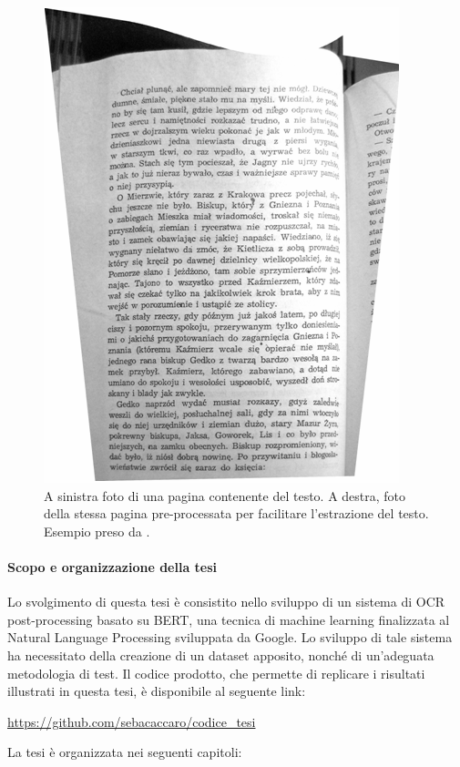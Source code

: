 \begin{figure}[H]
{\begin{minipage}{0.35\textwidth}
\includegraphics[width=\textwidth]{immagini/stato_arte/prep2}
\end{minipage}
\caption{A sinistra foto di una pagina contenente del testo. A destra, foto della stessa pagina pre-processata per facilitare l'estrazione del testo. Esempio preso da \cite{bieniecki2007image}.}
\label{fig:art_prep_ex}
}
\end{figure}
\noindent

\paragraph{Scopo e organizzazione della tesi} Lo svolgimento di questa tesi è consistito nello sviluppo di un sistema di OCR post-processing basato su BERT, una tecnica di machine learning finalizzata al Natural Language Processing sviluppata da Google. Lo sviluppo di tale sistema ha necessitato della creazione di un dataset apposito, nonché di un'adeguata metodologia di test. Il codice prodotto, che permette di replicare i risultati illustrati in questa tesi, è disponibile al seguente link:
\begin{center}
\url{https://github.com/sebacaccaro/codice_tesi}
\end{center}
\noindent
La tesi è organizzata nei seguenti capitoli:

